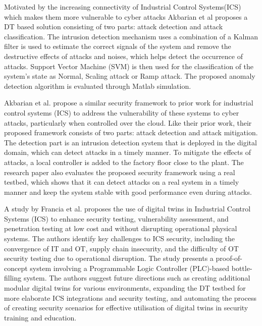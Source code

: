 Motivated by the increasing connectivity of Industrial Control Systems(ICS) which makes them more vulnerable to cyber attacks Akbarian et al\cite{akbarianIntrusionDetectionDigital2020} proposes a DT based solution consisting of two parts: attack detection and attack classification. The intrusion detection mechanism uses a combination of a Kalman filter is used  to estimate the correct signals of the system and remove the destructive effects of attacks and noises, which helps detect the occurrence of attacks. Support Vector Machine (SVM) is then used for the classification of the system's state as Normal, Scaling attack or Ramp attack. The proposed anomaly detection algorithm is evaluated through Matlab simulation.

Akbarian et al.\cite{akbarianSecurityFrameworkDigital2021} propose a similar security framework to prior work\cite{akbarianIntrusionDetectionDigital2020} for industrial control systems (ICS) to address the vulnerability of these systems to cyber attacks, particularly when controlled over the cloud. Like their prior work, their proposed framework consists of two parts: attack detection and attack mitigation. The detection part is an intrusion detection system that is deployed in the digital domain, which can detect attacks in a timely manner. To mitigate the effects of attacks, a local controller is added to the factory floor close to the plant. The research paper also evaluates the proposed security framework using a real testbed, which shows that it can detect attacks on a real system in a timely manner and keep the system stable with good performance even during attacks.

A study by Francia et al.\cite{franciaDigitalTwinsIndustrial2021} proposes the use of digital twins in Industrial Control Systems (ICS) to enhance security testing, vulnerability assessment, and penetration testing at low cost and without disrupting operational physical systems. The authors identify key challenges to ICS security, including the convergence of IT and OT, supply chain insecurity, and the difficulty of OT security testing due to operational disruption. The study presents a proof-of-concept system involving a Programmable Logic Controller (PLC)-based bottle-filling system. The authors suggest future directions such as creating additional modular digital twins for various environments, expanding the DT testbed for more elaborate ICS integrations and security testing, and automating the process of creating security scenarios for effective utilisation of digital twins in security training and education.

